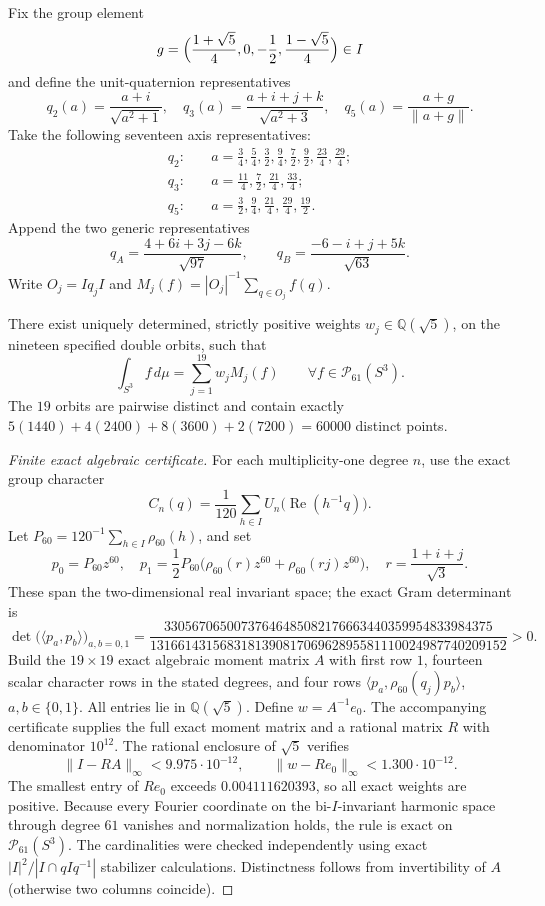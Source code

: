 \documentclass[11pt]{article}
\begin{document}
Fix the group element
\[
 g=\Bigl(\frac{1+\sqrt5}4,0,-\frac12,\frac{1-\sqrt5}4\Bigr)\in I
\]
and define the unit-quaternion representatives
\[
 q_2(a)=\frac{a+i}{\sqrt{a^2+1}},\quad
 q_3(a)=\frac{a+i+j+k}{\sqrt{a^2+3}},\quad
 q_5(a)=\frac{a+g}{\|a+g\|}.
\]
Take the following seventeen axis representatives:
\[
\begin{split}
 q_2:&\quad a=\tfrac34,\tfrac54,\tfrac32,\tfrac94,\tfrac72,
 \tfrac92,\tfrac{23}4,\tfrac{29}4;\\
 q_3:&\quad a=\tfrac{11}4,\tfrac72,\tfrac{21}4,\tfrac{33}4;\\
 q_5:&\quad a=\tfrac32,\tfrac94,\tfrac{21}4,\tfrac{29}4,\tfrac{19}2.
\end{split}
\]
Append the two generic representatives
\[
 q_A=\frac{4+6i+3j-6k}{\sqrt{97}},\qquad
 q_B=\frac{-6-i+j+5k}{\sqrt{63}}.
\]
Write $O_j=Iq_jI$ and $M_j(f)=|O_j|^{-1}\sum_{q\in O_j}f(q)$.

\begin{theorem}
\label{p1b:thm:cc112-degree61-positive}
There exist uniquely determined, strictly positive weights
$w_j\in\mathbb Q(\sqrt5)$, on the nineteen specified double orbits,
such that
\[
 \boxed{\int_{S^3}f\,d\mu=\sum_{j=1}^{19}w_j M_j(f)
 \qquad\forall f\in\mathcal P_{61}(S^3).}
\]
The $19$ orbits are pairwise distinct and contain exactly
$5(1440)+4(2400)+8(3600)+2(7200)=60000$ distinct points.
\end{theorem}

\begin{proof}[Finite exact algebraic certificate]
For each multiplicity-one degree $n$, use the exact group character
\[
 C_n(q)=\frac1{120}\sum_{h\in I}
 U_n\bigl(\operatorname{Re}(h^{-1}q)\bigr).
\]
Let $P_{60}=120^{-1}\sum_{h\in I}\rho_{60}(h)$, and set
\[
 p_0=P_{60}z^{60},\quad
 p_1=\frac12P_{60}\bigl(\rho_{60}(r)z^{60}
 +\rho_{60}(rj)z^{60}\bigr),\quad r=\frac{1+i+j}{\sqrt3}.
\]
These span the two-dimensional real invariant space; the exact
Gram determinant is
\[
 \det\bigl(\langle p_a,p_b\rangle\bigr)_{a,b=0,1}
 =\frac{33056706500737646485082176663440359954833984375}
 {131661431568318139081706962895581110024987740209152}>0.
\]
Build the $19\times19$ exact algebraic moment matrix $A$ with first
row $1$, fourteen scalar character rows in the stated degrees, and
four rows $\langle p_a,\rho_{60}(q_j)p_b\rangle$, $a,b\in\{0,1\}$.
All entries lie in $\mathbb Q(\sqrt5)$.  Define $w=A^{-1}e_0$.
The accompanying certificate supplies the full exact moment matrix
and a rational matrix $R$ with denominator $10^{12}$.
The rational enclosure of $\sqrt5$ verifies
\[
 \|I-RA\|_\infty<9.975\cdot10^{-12},\qquad
 \|w-Re_0\|_\infty<1.300\cdot10^{-12}.
\]
The smallest entry of $Re_0$ exceeds $0.004111620393$, so all exact
weights are positive.  Because every Fourier coordinate on the
bi-$I$-invariant harmonic space through degree $61$ vanishes and
normalization holds, the rule is exact on $\mathcal P_{61}(S^3)$.
The cardinalities were checked independently using exact
$|I|^2/|I\cap qIq^{-1}|$ stabilizer calculations.  Distinctness
follows from invertibility of $A$ (otherwise two columns coincide).
\end{proof}
\end{document}
